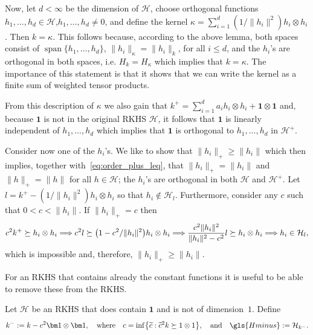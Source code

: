 \documentclass[AHL,Unicode,longabstracts,published]{cedram}
\theoremstyle{remark}
\DeclareMathOperator{\spn}{span}
\newcommand{\cH}{\mathcal{H}}
\let\oldtilde\tilde
\renewcommand*{\tilde}[1]{\mathchoice{\widetilde{#1}}{\widetilde{#1}}{\oldtilde{#1}}{\oldtilde{#1}}}
\renewcommand*{\implies}{\mathchoice{\Longrightarrow}{\Rightarrow}{\Rightarrow}{\Rightarrow}}
\let\originalleft\left
\let\originalright\right
\renewcommand{\left}{\mathopen{}\mathclose\bgroup\originalleft}
\renewcommand{\right}{\aftergroup\egroup\originalright}
\begin{document}
\pagebreak

Now, let $d< \infty $ be the dimension of $\cH$, choose orthogonal functions $h_1,\dots, h_d \in \cH$,\linebreak $h_1,\dots,h_d \not = 0$, and define the kernel $\kappa = \sum_{i=1}^d (1/\|h_i\|^2) h_i \otimes h_i$. Then $k = \kappa$. This follows because, according to the above lemma, both spaces consist of $\spn\{h_1,\dots, h_d\}$, $\|h_i\|_\kappa = \|h_i\|_k$, for all $i\leq d$, and the $h_i$'s are orthogonal in both spaces, i.e. $H_k = H_\kappa$ which implies that $k=\kappa$. The importance of this statement is that it shows that we can write the kernel as a finite sum of weighted tensor products.


From this description of $\kappa$ we also gain that $k^+ = \sum_{i=1}^d a_i h_i \otimes h_i + \bm 1 \otimes \bm 1$ and, because $\bm 1$ is not in the original RKHS $\cH$, it follows that $\bm 1$ is linearly independent of $h_1,\dots, h_d$ which implies that $\bm 1$ is orthogonal to $h_1,\dots, h_d$ in $\cH^+$.

Consider now one of the $h_i$'s. We like to show that $\|h_i\|_+ \geq \|h_i\|$ which then implies, together with~\eqref{eq:order_plus_leq}, that $\|h_i\|_+ = \|h_i\|$ and $\|h\|_+ = \|h\|$ for all $h\in \cH$; the $h_i$'s are orthogonal in both $\cH$ and $\cH^+$. Let $l = k^+ - (1/\|h_i\|^2) h_i \otimes h_i$ so that $h_i \not \in \cH_l$. Furthermore, consider any $c$ such that $0 < c < \|h_i\|$. If $\|h_i\|_+ = c$ then
\[
c^2 k^+ \succeq h_i \otimes h_i  \implies  c^2 l \succeq \left(1-c^2/\|h_i\|^2\right) h_i \otimes h_i \implies \frac{c^2\|h_i\|^2}{\|h_i\|^2-c^2} l \succeq h_i \otimes h_i \implies h_i \in \cH_l,
\]
which is impossible and, therefore, $\|h_i\|_+ \geq \|h_i\|$.


For an RKHS that contains already the constant functions it is useful to be able to remove these from the RKHS.
\begin{defi}
Let $\cH$ be an RKHS that does contain $\bm 1$ and is not of dimension~$1$. Define
\begin{equation}\label{def:k_minus}
k^- := k - c^2 \bm 1 \otimes \bm 1,\quad\text{where}\quad c =
\inf \left\{\tilde c: \tilde c^2 k \succeq 1 \otimes 1\right\}, \quad \text{and}\quad \gls{Hminus} := \cH_{k^-}.
\end{equation}
\end{defi}
\end{document}

